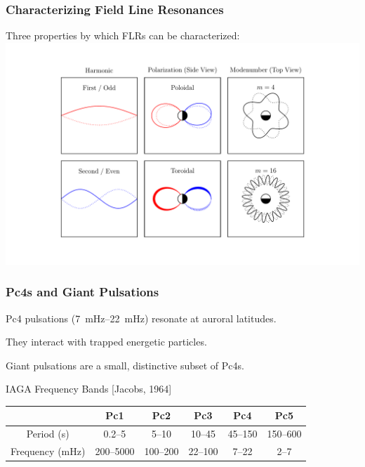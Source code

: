 \documentclass{beamer}
\begin{document}

\begin{frame}
\frametitle{Characterizing Field Line Resonances}

\vfill

Three properties by which FLRs can be characterized:
\includegraphics[width=\textwidth]{figures/properties.pdf}

\end{frame}


\begin{frame}
\frametitle{Pc4s and Giant Pulsations}

\begin{wideitemize}
\item Pc4 pulsations (\SIrange{7}{22}{\mHz}) resonate at auroral latitudes. 
\item They interact with trapped energetic particles. 
\item Giant pulsations are a small, distinctive subset of Pc4s.  
\end{wideitemize}

\vfill

\begin{center}
IAGA Frequency Bands [Jacobs, 1964]
\begin{tabular}{ @{\extracolsep{\fill}} cccccc @{\extracolsep{\fill}} }
  \hline
  & Pc1 & Pc2 & Pc3 & Pc4 & Pc5 \\
  \hline
  Period (\si{\second}) & 0.2--5    & 5--10    & 10--45  & 45--150 & 150--600 \\
  Frequency (\si{\mHz}) & 200--5000 & 100--200 & 22--100 & 7--22   & 2--7     \\
  \hline
\end{tabular}
\end{center}

\end{frame}
\end{document}

